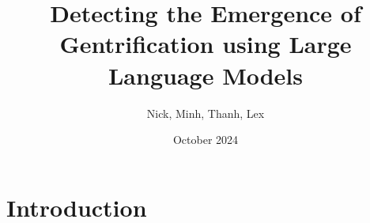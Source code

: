 \documentclass{article}
\title{Detecting the Emergence of Gentrification using Large Language Models}
\author{Nick, Minh, Thanh, Lex}
\date{October 2024}
\begin{document}
\maketitle

\section{Introduction}






\end{document}
